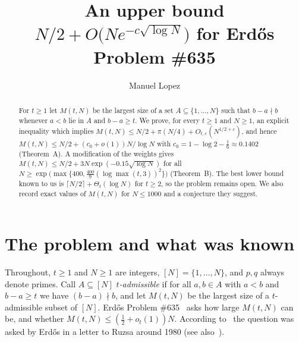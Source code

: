 \documentclass[11pt]{amsart}
\title{An upper bound $N/2+O\bigl(N e^{-c\sqrt{\log N}}\bigr)$ for Erd\H{o}s Problem \#635}
\author{Manuel Lopez}
\date{}
\theoremstyle{definition}
\theoremstyle{remark}
\begin{document}
\begin{abstract}
For $t\ge 1$ let $M(t,N)$ be the largest size of a set $A\subseteq\{1,\dots,N\}$ such that $b-a\nmid b$ whenever $a<b$ lie in $A$ and $b-a\ge t$.
We prove, for every $t\ge1$ and $N\ge1$, an explicit inequality which implies $M(t,N)\le N/2+\pi(N/4)+O_{t,\varepsilon}(N^{1/2+\varepsilon})$, and hence $M(t,N)\le N/2+(c_0+o(1))N/\log N$ with $c_0=1-\log 2-\tfrac16\approx0.1402$ (Theorem~A).
A modification of the weights gives $M(t,N)\le N/2+3N\exp(-0.15\sqrt{\log N})$ for all $N\ge \exp\bigl(\max\{400,\tfrac{400}{9}(\log\max(t,3))^2\}\bigr)$ (Theorem~B).
The best lower bound known to us is $\lceil N/2\rceil+\Theta_t(\log N)$ for $t\ge2$, so the problem remains open.
We also record exact values of $M(t,N)$ for $N\le 1000$ and a conjecture they suggest.
\end{abstract}

\maketitle

\section{The problem and what was known}

Throughout, $t\ge1$ and $N\ge1$ are integers, $[N]=\{1,\dots,N\}$, and $p,q$ always denote primes.
Call $A\subseteq[N]$ \emph{$t$-admissible} if for all $a,b\in A$ with $a<b$ and $b-a\ge t$ we have $(b-a)\nmid b$, and let $M(t,N)$ be the largest size of a $t$-admissible subset of $[N]$.
Erd\H{o}s Problem \#635~\cite{EP635} asks how large $M(t,N)$ can be, and whether $M(t,N)\le(\tfrac12+o_t(1))N$.
According to~\cite{EP635} the question was asked by Erd\H{o}s in a letter to Ruzsa around 1980 (see also~\cite{Gu83,Ru99}).
\end{document}
